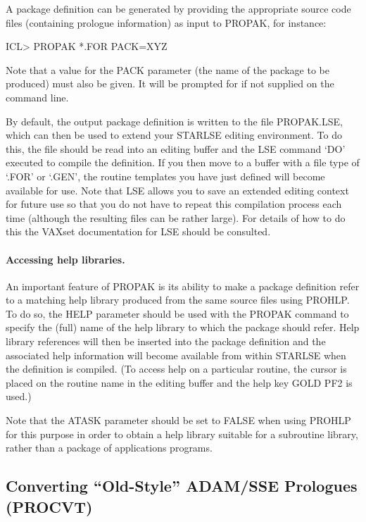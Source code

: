 \documentclass[twoside,11pt,nolof]{starlink}
\begin{document}
A package definition can be generated by providing the appropriate source
code files (containing prologue information) as input to PROPAK, for
instance:

\begin{terminalv}
ICL> PROPAK *.FOR PACK=XYZ
\end{terminalv}

Note that a value for the PACK parameter (the name of the package to be
produced) must also be given.
It will be prompted for if not supplied on the command line.

By default, the output package definition is written to the file PROPAK.LSE,
which can then be used to extend your STARLSE editing environment.
To do this, the file should be read into an editing buffer and the LSE
command `DO' executed to compile the definition.
If you then move to a buffer with a file type of `.FOR' or `.GEN', the
routine templates you have just defined will become available for use.
Note that LSE allows you to save an extended editing context for future use
so that you do not have to repeat this compilation process each time
(although the resulting files can be rather large).
For details of how to do this the VAXset documentation for LSE should be
consulted.

\paragraph{Accessing help libraries.}
An important feature of PROPAK is its ability to make a package definition
refer to a matching help library produced from the same source files using
PROHLP.
To do so, the HELP parameter should be used with the PROPAK command to
specify the (full) name of the help library to which the package should
refer.
Help library references will then be inserted into the package definition
and the associated help information will become available from within
STARLSE when the definition is compiled.
(To access help on a particular routine, the cursor is placed on the routine
name in the editing buffer and the help key GOLD PF2 is used.)

Note that the ATASK parameter should be set to FALSE when using PROHLP for
this purpose in order to obtain a help library suitable for a subroutine
library, rather than a package of applications programs.


\subsection{Converting ``Old-Style'' ADAM/SSE Prologues (PROCVT)}
\label{sect:procvt}
\end{document}
